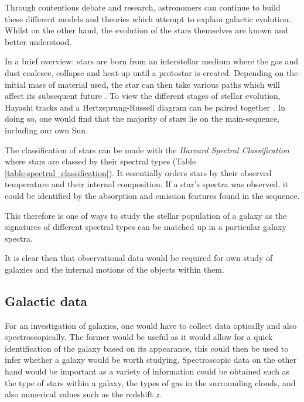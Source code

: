 \documentclass[12pt, twocolumn]{revtex4-1}    %
\begin{document}
Through contentious debate and research, astronomers can continue to build these different models and theories which attempt to explain galactic evolution. Whilst on the other hand, the evolution of the stars themselves are known and better understood. 

In a brief overview: stars are born from an interstellar medium where the gas and dust coalesce, collapse and heat-up until a protostar is created. Depending on the initial mass of material used, the star can then take various paths which will affect its subsequent future \citep{mccoy_space_sciences}. To view the different stages of stellar evolution, Hayashi tracks and a Hertzsprung-Russell diagram can be paired together \citep{carroll_astro}. In doing so, one would find that the majority of stars lie on the main-sequence, including our own Sun.  


The classification of stars can be made with the \textit{Harvard Spectral Classification} where stars are classed by their spectral types (Table \ref{table:spectral_classification}). It essentially orders stars by their observed temperature and their internal composition. If a star's spectra was observed, it could be identified by the absorption and emission features found in the sequence.   

This therefore is one of ways to study the stellar population of a galaxy as the signatures of different spectral types can be matched up in a particular galaxy spectra. 

It is clear then that observational data would be required for own study of galaxies and the internal motions of the objects within them. 

\subsection*{Galactic data} 

For an investigation of galaxies, one would have to collect data optically and also spectroscopically. The former would be useful as it would allow for a quick identification of the galaxy based on its appearance, this could then be used to infer whether a galaxy would be worth studying. Spectroscopic data on the other hand would be important as a variety of information could be obtained such as the type of stars within a galaxy, the types of gas in the surrounding clouds, and also numerical values such as the redshift $z$. 
\end{document}
